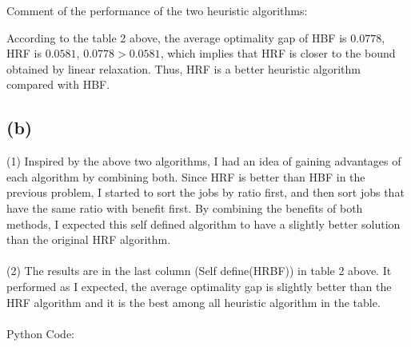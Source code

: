 \documentclass{article}
\begin{document}
Comment of the performance of the two heuristic algorithms:

According to the table 2 above, the average optimality gap of HBF is $0.0778$, HRF is $0.0581$, $0.0778 > 0.0581$, which implies that HRF is closer to the bound obtained by linear relaxation. Thus, HRF is a better heuristic algorithm compared with HBF.

\subsection{(b)}
(1) Inspired by the above two algorithms, I had an idea of gaining advantages of each algorithm by combining both. Since HRF is better than HBF in the previous problem, I started to sort the jobs by ratio first, and then sort jobs that have the same ratio with benefit first. By combining the benefits of both methods, I expected this self defined algorithm to have a slightly better solution than the original HRF algorithm.\\
\\(2) The results are in the last column (Self define(HRBF)) in table 2 above. It performed as I expected, the average optimality gap is slightly better than the HRF algorithm and it is the best among all heuristic algorithm in the table.
\\
\\Python Code:
\end{document}
